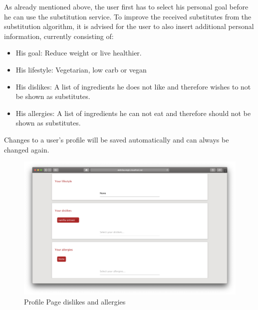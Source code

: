 As already mentioned above, the user first has to select his personal goal before he can use the substitution service. To improve the received substitutes from the substitution algorithm, it is advised for the user to also insert additional personal information, currently consisting of:
\begin{itemize}
\item His goal: Reduce weight or live healthier.
\item His lifestyle: Vegetarian, low carb or vegan
\item His dislikes: A list of ingredients he does not like and therefore wishes to not be shown as substitutes.
\item His allergies: A list of ingredients he can not eat and therefore should not be shown as substitutes.
\end{itemize}
Changes to a user’s profile will be saved automatically and can always be changed again.

\vspace{-2em}
\begin{figure}[H]
	\captionsetup{justification=centering}
	\begin{center}
		\includegraphics[scale=0.25]{Ressourcen/img/screenshots/screenshotP.png}
		\vspace{-3em}
		\caption{Profile Page dislikes and allergies}
	\end{center}
\end{figure}

